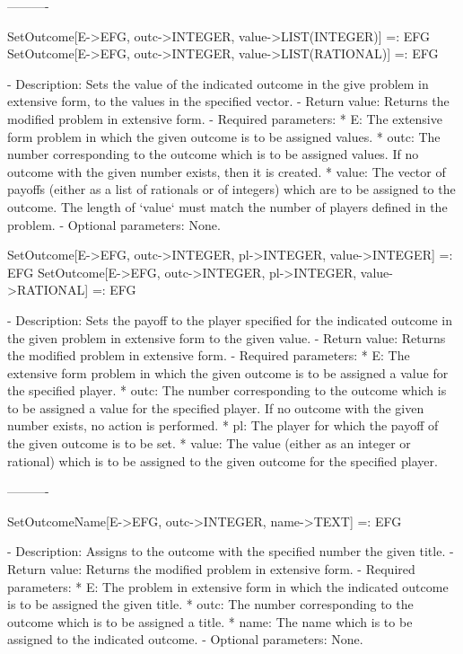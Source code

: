 ----------

SetOutcome[E->EFG, outc->INTEGER, value->LIST(INTEGER)] =: EFG
SetOutcome[E->EFG, outc->INTEGER, value->LIST(RATIONAL)] =: EFG

   -	Description:  Sets the value of the indicated outcome in the give 
	problem in extensive form, to the values in the specified vector.
   -	Return value:  Returns the modified problem in extensive form. 
   -	Required parameters:
	  *  E:  The extensive form problem in which the given outcome is to be
		assigned values.
	  *  outc:  The number corresponding to the outcome which is to be 
		assigned values.  If no outcome with the given number exists,
		then it is created.
	  *  value:  The vector of payoffs (either as a list of rationals or of
		integers) which are to be assigned to the outcome.  The length
		of `value` must match the number of players defined in the 
		problem.
   -	Optional parameters:  None.


SetOutcome[E->EFG, outc->INTEGER, pl->INTEGER, value->INTEGER] =: EFG
SetOutcome[E->EFG, outc->INTEGER, pl->INTEGER, value->RATIONAL] =: EFG

   -	Description:  Sets the payoff to the player specified for the indicated
	outcome in the given problem in extensive form to the given value.
   -	Return value:  Returns the modified problem in extensive form.
   -	Required parameters:
	  *  E:  The extensive form problem in which the given outcome is to be
		assigned a value for the specified player.
	  *  outc:  The number corresponding to the outcome which is to be 
		assigned a value for the specified player.  If no outcome with
		 the given number exists, no action is performed.
	  *  pl:  The player for which the payoff of the given outcome is to be
		set.
	  *  value:  The value (either as an integer or rational) which is to
		be assigned to the given outcome for the specified player.

----------

SetOutcomeName[E->EFG, outc->INTEGER, name->TEXT] =: EFG

   -	Description:  Assigns to the outcome with the specified number the 
	given title.
   -	Return value:  Returns the modified problem in extensive form.
   -	Required parameters:
	  *  E:  The problem in extensive form in which the indicated outcome 
		is to be assigned the given title.
	  *  outc:  The number corresponding to the outcome which is to be 
		assigned a title.
	  *  name:  The name which is to be assigned to the indicated outcome.
   -	Optional parameters:  None.

